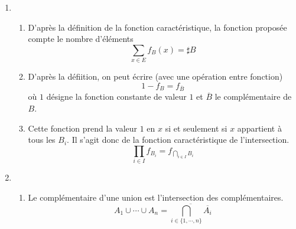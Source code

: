 \begin{enumerate}
 \item \begin{enumerate}
 \item D'après la définition de la fonction caractéristique, la fonction proposée compte le nombre d'éléments
\begin{displaymath}
 \sum_{x\in E}f_B(x) = \sharp B
\end{displaymath}
\item D'après la défiition, on peut écrire (avec une opération entre fonction)
\begin{displaymath}
 1-f_B = f_{\overline{B}}
\end{displaymath}
où $1$ désigne la fonction constante de valeur $1$ et $\overline{B}$ le complémentaire de $B$.
\item Cette fonction prend la valeur $1$ en $x$ si et seulement si $x$ appartient à tous les $B_i$. Il s'agit donc de la fonction caractéristique de l'intersection.
\begin{displaymath}
 \prod _{i\in I}f_{B_i} = f_{\bigcap_{i\in I} B_i}
\end{displaymath}
\end{enumerate}
\item \begin{enumerate}
 \item Le complémentaire d'une union est l'intersection des complémentaires.
\begin{displaymath}
 A_1\cup \cdots \cup A_n  = \overline{\bigcap _{i\in \{1,\cdots,n\}}\overline{A_i}}
\end{displaymath}
\end{enumerate}


\end{enumerate}
